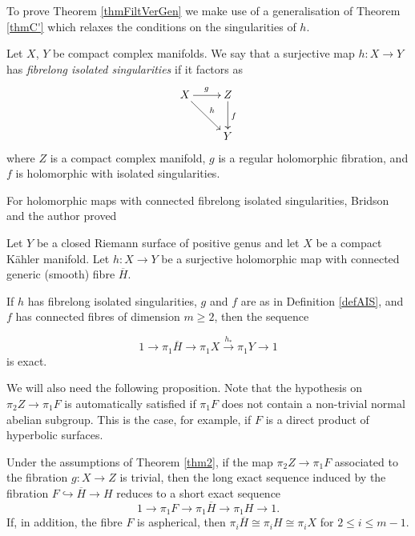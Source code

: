 To prove Theorem \ref{thmFiltVerGen} we make use of a generalisation of Theorem \ref{thmC'} which relaxes the conditions on the singularities of $h$.
 
\begin{definition}
 Let $X$, $Y$ be compact complex manifolds. We say that a surjective map $h: X\rightarrow Y$ has \textit{fibrelong isolated singularities} if it factors as
 \[
  \xymatrix{ X \ar[r]^g \ar[rd]^h & Z\ar[d]^f \\ & Y\\}
 \]
 where $Z$ is a compact complex manifold, $g$ is a regular holomorphic fibration, and $f$ is holomorphic with isolated singularities.
 \label{defAIS}
\end{definition}

For holomorphic maps with connected fibrelong isolated singularities, Bridson and the author proved

\begin{theorem}
\label{thm2}
Let $Y$ be a closed Riemann surface of positive genus and let $X$ be a compact K\"ahler manifold. Let $h:X\rightarrow Y$ be a surjective holomorphic map with connected generic (smooth) fibre $\overline{H}$.

If $h$ has fibrelong isolated singularities, $g$ and $f$ are as in Definition \ref{defAIS}, and $f$ has connected fibres of dimension $m\geq 2$, then the sequence 

\[  
1 \rightarrow \pi_1 \overline{H}\rightarrow \pi_1 X \overset{h_{\ast}}\rightarrow \pi_1 Y\rightarrow 1
\]
is exact.
\end{theorem}


We will also need the following proposition. Note that the hypothesis on $\pi_2 Z\to \pi_1F$  is automatically
satisfied if $\pi_1F$ does not contain a non-trivial normal abelian subgroup. This is the case, for example,
if $F$ is a direct product of hyperbolic surfaces.

\begin{proposition}
\label{prop1part2}
Under the assumptions of Theorem \ref{thm2}, if the map $\pi_2 Z\to \pi_1F$ associated to the fibration $g:X\to Z$ is trivial, then the long exact sequence induced by the fibration $F\hookrightarrow \overline{H}\rightarrow H$ reduces to a short exact sequence
\[
1\rightarrow \pi_1 F\rightarrow \pi_1 \overline{H}\rightarrow \pi_1 H\rightarrow 1.
\]
If, in addition, the fibre $F$ is aspherical, then $\pi_ i \overline{H} \cong \pi_i H \cong \pi_i X$ for $2\leq i \leq m - 1$.
\end{proposition}

